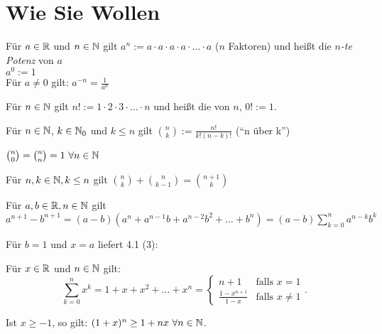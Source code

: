 \documentclass[a4paper,oneside,DIV15,BCOR12mm]{scrbook}
\begin{document}
\chapter{Wie Sie Wollen}

\begin{definition}
\begin{liste}
\item Für $a \in\mathbb{R}$ und $n\in\mathbb{N}$ gilt $a^n := a\cdot a\cdot a\cdot a\cdot \ldots \cdot a$ ($n$ Faktoren) und heißt die \textit{$n$-te Potenz} von $a$\\
    $a^0:=1$ \\
    Für $a\ne 0$ gilt: $a^{-n}=\frac{1}{a^n}$ 
\item Für $n\in\mathbb{N}$ gilt $n! := 1\cdot 2\cdot 3\cdot \ldots \cdot n $ und heißt die  von $n$, $0! := 1$.
\item Für $n\in\mathbb{N}$, $k\in\mathbb{N}_{0}$ und $k\le n$ gilt $\binom{n}{k}:=\frac{n!}{k!(n-k)!}$ ("`n über k"')
\end{liste}
\end{definition}

\begin{satz}
\begin{liste}
\item $\binom{n}{0}=\binom{n}{n}=1\ \forall n\in\mathbb{N}$
\item Für $n,k\in\mathbb{N}, k\le n$ gilt $\binom{n}{k}+\binom{n}{k-1}=\binom{n+1}{k}$
\item Für $a,b\in\mathbb{R}, n\in\mathbb{N}$ gilt $a^{n+1}-b^{n+1}=(a-b)(a^n+a^{n-1}b+a^{n-2}b^2+\ldots+b^n) = (a-b) \sum_{k=0}^n a^{n-k}b^k$
\end{liste}
\end{satz}

\begin{satz}[Folgerung]
Für $b=1$ und $x=a$ liefert 4.1 (3):

Für $x\in\mathbb{R}$ und $n\in\mathbb{N}$ gilt:
$$\sum_{k=0}^{n}{x^k}=1+x+x^2+\ldots+x^n=\begin{cases}
 n+1&  \text{falls }x=1\\
 \frac{1-x^{n+1}}{1-x}&  \text{falls }x\ne1
 \end{cases}\text{.}$$
\end{satz}

\begin{satz}
Ist $x\ge-1$, so gilt: $(1+x)^n\ge1+nx\ \forall n\in\mathbb{N}$.
\end{satz}
\end{document}
